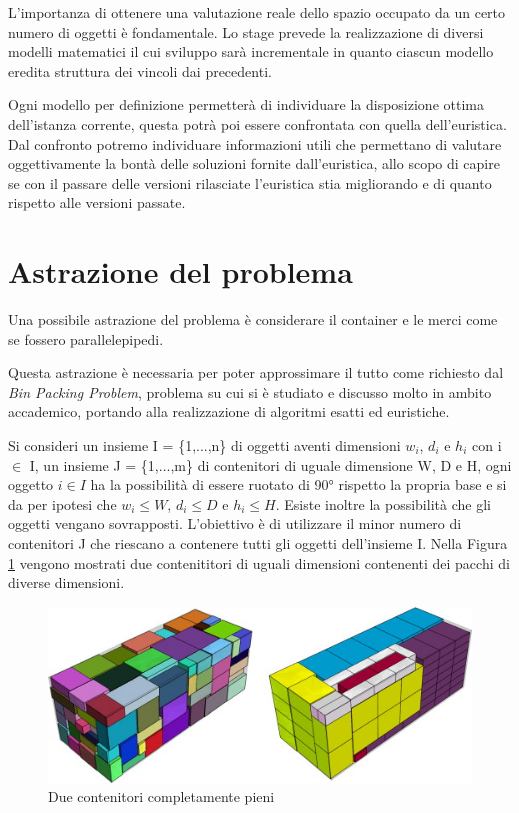 L'importanza di ottenere una valutazione reale dello spazio occupato da un certo numero di oggetti è fondamentale. Lo stage prevede la realizzazione di diversi modelli matematici il cui sviluppo sarà incrementale in quanto ciascun modello eredita struttura dei vincoli dai precedenti.

Ogni modello per definizione permetterà di individuare la disposizione ottima dell'istanza corrente, questa potrà poi essere confrontata con quella dell'euristica. Dal confronto potremo individuare informazioni utili che permettano di valutare oggettivamente la bontà delle soluzioni fornite dall'euristica, allo scopo di capire se con il passare delle versioni rilasciate l'euristica stia migliorando e di quanto rispetto alle versioni passate.

\section{Astrazione del problema}
Una possibile astrazione del problema è considerare il container e le merci come se fossero parallelepipedi.

Questa astrazione è necessaria per poter approssimare il tutto come richiesto dal \textit{Bin Packing Problem}, problema su cui si è studiato e discusso molto in ambito accademico, portando alla realizzazione di algoritmi esatti ed euristiche.

Si consideri un insieme I = \{1,...,n\} di oggetti aventi dimensioni $w_{i}$, $d_{i}$ e $h_{i}$ con i $\in$ I, un insieme J = \{1,...,m\} di contenitori di uguale dimensione W, D e H, ogni oggetto $i \in I$ ha la possibilità di essere ruotato di 90° rispetto la propria base e si da per ipotesi che $w_{i} \leq W$, $d_{i} \leq D$ e $h_{i} \leq H$. Esiste inoltre la possibilità che gli oggetti vengano sovrapposti. L'obiettivo è di utilizzare il minor numero di contenitori J che riescano a contenere tutti gli oggetti dell'insieme I. Nella Figura \ref{bin_packing_figures} vengono mostrati due contenititori di uguali dimensioni contenenti dei pacchi di diverse dimensioni.
\begin{figure}[H]
	\begin{center} \includegraphics[scale=0.8]{figures/bin_packing}
		\caption[Contenitori Bin Packing]{Due contenitori completamente pieni}  
		\label{bin_packing_figures}
	\end{center}
\end{figure}

